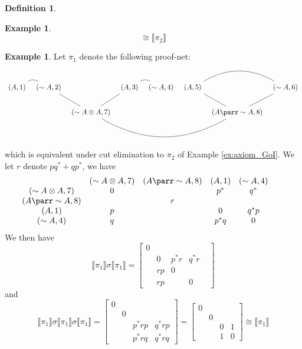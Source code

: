 \documentclass[12pt]{article}
\theoremstyle{plain}
\theoremstyle{definition}
\newtheorem{defn}[thm]{Definition} %
\newtheorem{example}[thm]{Example}
\newcommand{\negation}{\sim}
\begin{document}
\begin{defn}
\begin{example}
\begin{equation}
\cong \llbracket \pi_2\rrbracket
\end{equation}
\end{example}
\begin{example}
Let $\pi_1$ denote the following proof-net:
\begin{equation}
\begin{tikzcd}[column sep = tiny]
{(A,1)}\arrow[r,bend left, dash] & {(\negation A, 2)}\arrow[dr,dash] & & {(A, 3)}\arrow[dl,dash]\arrow[r,bend left, dash] & {(\negation A, 4)} & {(A, 5)\arrow[rr,bend left, dash]}\arrow[dr,dash] & & {(\negation A, 6)}\arrow[dl,dash]\\
& & {(\negation A \otimes A, 7)}\arrow[rrrr, bend right,dash] & & & & {(A \parr \negation A, 8)}
\end{tikzcd}
\end{equation}
which is equivalent under cut elimination to $\pi_2$ of Example \ref{ex:axiom_GoI}. We let $r$ denote $pq^\ast + qp^\ast$, we have
\begin{equation}
\begin{matrix}
& (\negation A \otimes A, 7) & (A \parr \negation A, 8) & (A,1) &  (\negation A, 4) \\
(\negation A \otimes A, 7) &0&&p^\ast&q^\ast&&\\
(A \parr \negation A, 8) &&r&\\
(A,1) &p&&0&q^\ast p&&\\
(\negation A, 4) &q&&p^\ast q&0
\end{matrix}
\end{equation}
We then have
\begin{equation}
\llbracket \pi_1 \rrbracket \sigma \llbracket \pi_1 \rrbracket =
\begin{bmatrix}
0&&&\\
&0&p^\ast r&q^\ast r &\\
& rp &0&\\
& rp &&0
\end{bmatrix}
\end{equation}
and
\begin{equation}
\llbracket \pi_1 \rrbracket \sigma \llbracket \pi_1 \rrbracket \sigma \llbracket \pi_1 \rrbracket = 
\begin{bmatrix}
0&&&\\
&0&&\\
&& p^\ast r p & q^\ast r p\\
&& p^\ast r q & q^\ast r q
\end{bmatrix}
=
\begin{bmatrix}
0&&&\\
&0&&\\
&& 0 & 1\\
&& 1 & 0
\end{bmatrix}
\cong \llbracket \pi_1 \rrbracket
\end{equation}
\end{example}




\end{defn}
\end{document}

